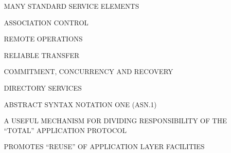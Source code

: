 

\begin{bwslide}

\begin{nrtc}
\item	MANY STANDARD SERVICE ELEMENTS
    \begin{nrtc}
    \item	ASSOCIATION CONTROL

    \item	REMOTE OPERATIONS

    \item	RELIABLE TRANSFER

    \item	COMMITMENT, CONCURRENCY AND RECOVERY

    \item	DIRECTORY SERVICES
    \end{nrtc}

\item	ABSTRACT SYNTAX NOTATION ONE (ASN.1)
\end{nrtc}
\end{bwslide}




\begin{bwslide}

\begin{nrtc}
\item	A USEFUL MECHANISM FOR DIVIDING RESPONSIBILITY OF THE ``TOTAL''
	APPLICATION PROTOCOL

\item	PROMOTES ``REUSE'' OF APPLICATION LAYER FACILITIES
\end{nrtc}
\end{bwslide}


